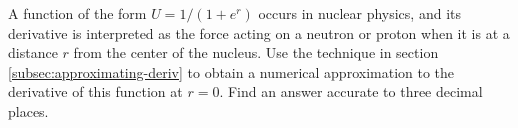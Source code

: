 A function of the form $U=1/(1+e^r)$ occurs in nuclear physics,
and its derivative is interpreted as the force acting on a neutron
or proton when it is at a distance $r$ from the center of the nucleus.
Use the technique in section \ref{subsec:approximating-deriv} to
obtain a numerical approximation to the derivative of this
function at $r=0$. Find an answer accurate to
three decimal places.\answercheck
